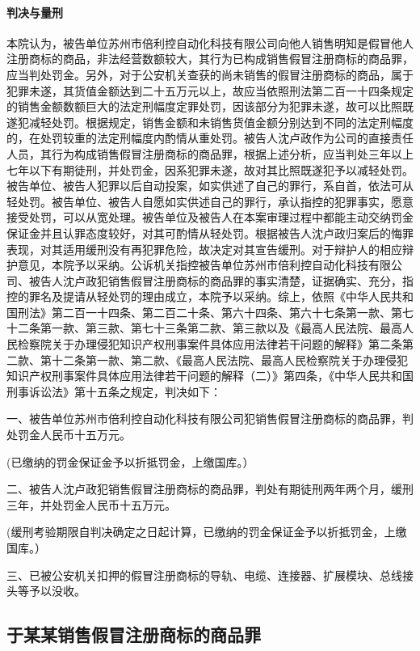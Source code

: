 \documentclass[
    a4paper
    ]{ctexart}
\begin{document}
{\begin{sloppy}
\paragraph{判决与量刑}
本院认为，被告单位苏州市倍利控自动化科技有限公司向他人销售明知是假冒他人注册商标的商品，非法经营数额较大，其行为已构成销售假冒注册商标的商品罪，应当判处罚金。另外，对于公安机关查获的尚未销售的假冒注册商标的商品，属于犯罪未遂，其货值金额达到二十五万元以上，故应当依照刑法第二百一十四条规定的销售金额数额巨大的法定刑幅度定罪处罚，因该部分为犯罪未遂，故可以比照既遂犯减轻处罚。根据规定，销售金额和未销售货值金额分别达到不同的法定刑幅度的，在处罚较重的法定刑幅度内酌情从重处罚。被告人沈卢政作为公司的直接责任人员，其行为构成销售假冒注册商标的商品罪，根据上述分析，应当判处三年以上七年以下有期徒刑，并处罚金，因系犯罪未遂，故对其比照既遂犯予以减轻处罚。被告单位、被告人犯罪以后自动投案，如实供述了自己的罪行，系自首，依法可从轻处罚。被告单位、被告人自愿如实供述自己的罪行，承认指控的犯罪事实，愿意接受处罚，可以从宽处理。被告单位及被告人在本案审理过程中都能主动交纳罚金保证金并且认罪态度较好，对其可酌情从轻处罚。根据被告人沈卢政归案后的悔罪表现，对其适用缓刑没有再犯罪危险，故决定对其宣告缓刑。对于辩护人的相应辩护意见，本院予以采纳。公诉机关指控被告单位苏州市倍利控自动化科技有限公司、被告人沈卢政犯销售假冒注册商标的商品罪的事实清楚，证据确实、充分，指控的罪名及提请从轻处罚的理由成立，本院予以采纳。综上，依照《中华人民共和国刑法》第二百一十四条、第二百二十条、第六十四条、第六十七条第一款、第七十二条第一款、第三款、第七十三条第二款、第三款以及《最高人民法院、最高人民检察院关于办理侵犯知识产权刑事案件具体应用法律若干问题的解释》第二条第二款、第十二条第一款、第二款、《最高人民法院、最高人民检察院关于办理侵犯知识产权刑事案件具体应用法律若干问题的解释（二）》第四条，《中华人民共和国刑事诉讼法》第十五条之规定，判决如下：

一、被告单位苏州市倍利控自动化科技有限公司犯销售假冒注册商标的商品罪，判处罚金人民币十五万元。

(已缴纳的罚金保证金予以折抵罚金，上缴国库。）

二、被告人沈卢政犯销售假冒注册商标的商品罪，判处有期徒刑两年两个月，缓刑三年，并处罚金人民币十五万元。

(缓刑考验期限自判决确定之日起计算，已缴纳的罚金保证金予以折抵罚金，上缴国库。）

三、已被公安机关扣押的假冒注册商标的导轨、电缆、连接器、扩展模块、总线接头等予以没收。

\subsection{于某某销售假冒注册商标的商品罪}

\end{sloppy}}
\end{document}
